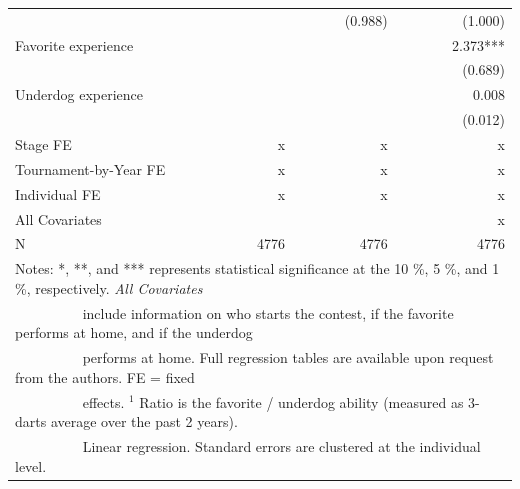 \documentclass[11pt,a4paper]{article}
\begin{document}
\begin{table}[H]
\begin{tabular}{l r r r r r r }
			                               & &           & &  (0.988)  & &  (1.000)          \\
			Favorite experience            & &           & &           & &   2.373***        \\
			                               & &           & &           & &  (0.689)          \\
			Underdog experience            & &           & &           & &  0.008            \\
			                               & &           & &           & &  (0.012)          \\
            \midrule
			Stage FE                       & &  x         & &  x         & &  x              \\ 
            Tournament-by-Year FE          & &  x         & &  x         & &  x              \\
			Individual FE                  & &  x         & &  x         & &  x              \\
			All Covariates                 & &            & &            & &  x              \\
			\midrule 
            N                              & &   4776     & &   4776     & &   4776          \\ 
			\bottomrule \bottomrule
			\multicolumn{7}{l}{\footnotesize Notes: *, **, and *** represents statistical significance at the 10 \%, 5 \%, and 1 \%, respectively. \textit{All Covariates}}\\
			\multicolumn{7}{l}{\footnotesize ~~~~~~~~~    include information on who starts the contest, if the favorite performs at home, and if the underdog}\\
			\multicolumn{7}{l}{\footnotesize ~~~~~~~~~     performs at home. Full regression tables are available upon request from the authors. FE = fixed }\\
			\multicolumn{7}{l}{\footnotesize ~~~~~~~~~   effects. $^{1}$ Ratio is the favorite / underdog ability (measured as 3-darts average over the past 2 years).}\\
			\multicolumn{7}{l}{\footnotesize ~~~~~~~~~  Linear regression. Standard errors are clustered at the individual level.}
		\end{tabular}
	\end{table}
\end{document}
